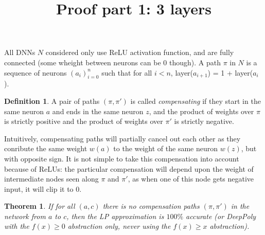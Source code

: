 \documentclass[]{article}
\title{Proof part 1: 3 layers}
\date{}
\newtheorem{theorem}{Theorem}
\theoremstyle{definition}
\newtheorem{definition}{Definition}
\begin{document}
\maketitle

All DNNs $N$ considered only use ReLU activation function, and are fully connected (some wheight between neurons can be 0 though).
A path $\pi$ in $N$ is a sequence of neurons $(a_i)_{i=0}^n$ such that for all $i < n$, layer($a_{i+1}$) = 1 + layer($a_{i}$).

\begin{definition}
	A pair of paths $(\pi,\pi')$
	is called {\em compensating} if they start in the same neuron $a$ and ends in the same neuron $z$, and the product of weights over $\pi$ is strictly positive and the product of weights over $\pi'$ is strictly negative.
\end{definition}

Intuitively, compensating paths will partially cancel out each other as they conribute the same weight $w(a)$ to the weight of the same neuron $w(z)$, but with opposite sign. 
It is not simple to take this compensation into account because of ReLUs: the particular compensation will depend upon the weight of intermediate nodes seen along $\pi$ and $\pi'$, 
as when one of this node gets negative input, it will clip it to 0.


\begin{theorem}
	If for all $(a,c)$ there is no compensation paths $(\pi,\pi')$ 
	in the network from $a$ to $c$, then the LP approximation is 
	$100\%$ accurate (or DeepPoly with the $f(x) \geq 0$ abstraction only, never using the 
	$f(x) \geq x$ abstraction). 
\end{theorem}
\end{document}

